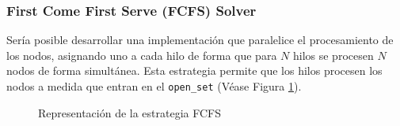 


\subsubsection{First Come First Serve (FCFS) Solver}

Sería posible desarrollar una implementación que paralelice el procesamiento de los nodos,
asignando uno a cada hilo de forma que para $N$ hilos se procesen $N$ nodos
de forma simultánea.
Esta estrategia permite que los hilos procesen los nodos a medida que entran en 
el \lstinline{open_set} (Véase Figura \ref{fig:RepresentacionFCFS}).

\begin{figure}[h]
    \begin{center}
    \end{center}
    \caption{Representación de la estrategia FCFS}
    \label{fig:RepresentacionFCFS}
\end{figure}

